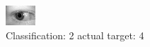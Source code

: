 \begin{figure}[h!]
\begin{center}
\includegraphics[width=0.60\columnwidth]{figures/ID842_class_2_target_4.png}
\end{center}
\caption{ Classification: 2 actual target: 4}
\label{fig:ID842_class_2_target_4}
\end{figure}
